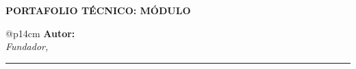 


\begin{flushleft}
\sffamily

{\color{WasaffCopper}\large\bfseries PORTAFOLIO TÉCNICO: MÓDULO \moduleNumber}

\vspace{1.5em} %

{\color{WasaffNavy} \huge \bfseries \moduleTitle}

\vspace{0.5em} %

{\Large\itshape \moduleSubtitle}

\vspace{3em} %

\rmfamily 
\begin{tabular}{@{}p{14cm}}
    \textbf{Autor:} \consultingAuthor \\
    \textit{Fundador, \consultingCompany} \\
\end{tabular}

\vspace{2em} %

\noindent\color{black!25}\rule{\linewidth}{0.5pt}

\end{flushleft}

\vspace{1em} %

\tableofcontents
\
\hrulefill
\
\newpage



\ifdefined\partBfile
    \clearpage 
    
\fi

\newpage




